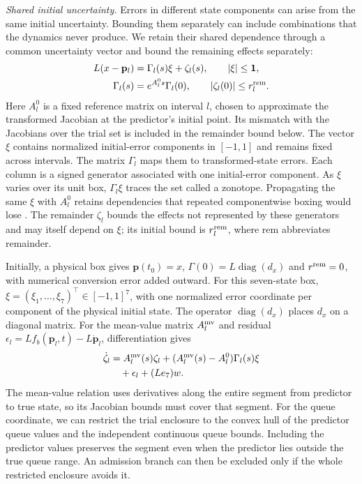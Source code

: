 \documentclass[final]{cas-sc}
\theoremstyle{definition}
\theoremstyle{plain}
\theoremstyle{definition}
\theoremstyle{plain}
\begin{document}
\medskip
\noindent\emph{Shared initial uncertainty.} Errors in different state
components can arise from the same initial uncertainty. Bounding them
separately can include combinations that the dynamics never produce.
We retain their shared dependence through a common uncertainty vector
and bound the remaining effects separately:
\begin{equation}
\begin{aligned}
L(x-\mathbf p_l)&=\Gamma_l(s)\xi+\zeta_l(s),\qquad |\xi|\le\mathbf 1,\\
\Gamma_l(s)&=e^{A_l^0s}\Gamma_l(0),\qquad
|\zeta_l(0)|\le r_l^{\rm rem}.
\end{aligned}
\label{eq:structure-affine-set}
\end{equation}
Here $A_l^0$ is a fixed reference matrix on interval $l$, chosen to
approximate the transformed Jacobian at the predictor's initial point.
Its mismatch with the Jacobians over the trial set is included in the
remainder bound below. The vector $\xi$ contains normalized
initial-error components in $[-1,1]$ and remains fixed across
intervals. The matrix $\Gamma_l$ maps them to transformed-state errors.
Each column is a signed generator associated with one initial-error
component. As $\xi$ varies over its unit box, $\Gamma_l\xi$ traces the
set called a zonotope. Propagating the same $\xi$ with $A_l^0$ retains
dependencies that repeated componentwise boxing would lose
\cite{kochdumper2021sparse}. The remainder $\zeta_l$ bounds the effects
not represented by these generators and may itself depend on $\xi$;
its initial bound is $r_l^{\rm rem}$, where rem abbreviates remainder.

Initially, a physical box gives $\mathbf p(t_0)=\widehat x$,
$\Gamma(0)=L\operatorname{diag}(d_x)$ and $r^{\rm rem}=0$, with
numerical conversion error added outward. For this seven-state box,
$\xi=(\xi_1,\ldots,\xi_7)^\top\in[-1,1]^7$, with one normalized error
coordinate per component of the physical initial state. The operator
$\operatorname{diag}(d_x)$ places $d_x$ on a diagonal matrix. For the
mean-value matrix $A_l^{\rm mv}$ and residual
$\epsilon_l=Lf_b(\mathbf p_l,t)-L\dot{\mathbf p}_l$, differentiation
gives
\begin{equation}
\begin{aligned}
\dot\zeta_l&=A_l^{\rm mv}(s)\zeta_l
+(A_l^{\rm mv}(s)-A_l^0)\Gamma_l(s)\xi\\
&\quad+\epsilon_l+(Le_7)w.
\end{aligned}
\label{eq:structure-remainder-identity}
\end{equation}
The mean-value relation uses derivatives along the entire segment from
predictor to true state, so its Jacobian bounds must cover that
segment. For the queue coordinate, we can restrict the trial enclosure
to the convex hull of the predictor queue values and the independent
continuous queue bounds. Including the predictor values preserves the
segment even when the predictor lies outside the true queue range. An
admission branch can then be excluded only if the whole restricted
enclosure avoids it.
\end{document}
